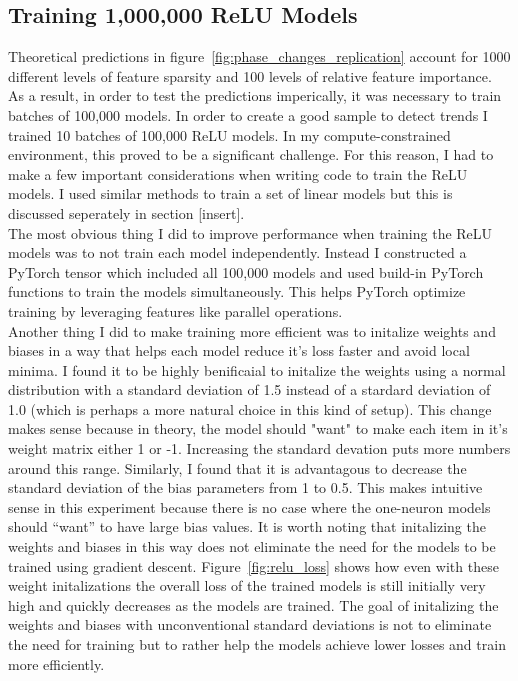 \documentclass{article} %
\begin{document}
\subsection{Training 1,000,000 ReLU Models}

Theoretical predictions in figure~\ref{fig:phase_changes_replication} account
for 1000 different levels of feature sparsity and 100 levels of relative feature
importance. As a result, in order to test the predictions imperically, it was
necessary to train batches of 100,000 models. In order to create a good sample
to detect trends I trained 10 batches of 100,000 ReLU models. In my compute-constrained environment,
this proved to be a significant challenge. For this reason, I had to make a few
important considerations when writing code to train the ReLU models. I used 
similar methods to train a set of linear models but this is discussed seperately
in section [insert].\\

The most obvious thing I did to improve performance when training the 
ReLU models was to not train each model independently. Instead I constructed a 
PyTorch tensor which included all 100,000 models and used build-in PyTorch functions 
to train the models simultaneously. This helps PyTorch optimize training by 
leveraging features like parallel operations. \\

Another thing I did to make training more efficient was to initalize weights and
biases in a way that helps each model reduce it's loss faster and avoid local minima.
I found it to be highly benificaial to initalize the weights using a normal 
distribution with a standard deviation of 1.5 instead of a stardard deviation of
1.0 (which is perhaps a more natural choice in this kind of setup). This change
makes sense because 
in theory, the model should "want" to make each item in it's weight matrix
either 1 or -1. Increasing the standard devation puts more numbers around this range.
Similarly, I found that it is advantagous to decrease the standard deviation of the
bias parameters from 1 to 0.5. This makes intuitive sense in this experiment because
there is no case where the one-neuron models should ``want'' to have large bias values.
It is worth noting that initalizing the weights and biases in this way does
not eliminate the need for the models to be trained using gradient descent.
Figure~\ref{fig:relu_loss} shows how even with these weight initalizations the
overall loss of the trained models is still initially very high and quickly
decreases as the models are trained. The goal of initalizing the weights and biases
with unconventional standard deviations is not to eliminate the need for training
but to rather help the models achieve lower losses and train more efficiently.
\end{document}
